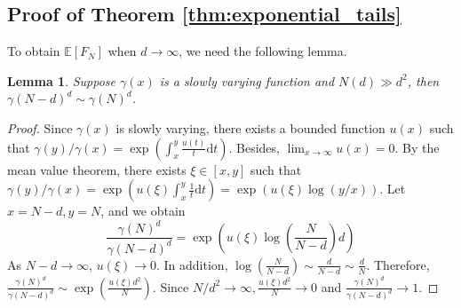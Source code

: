 \documentclass[conference,a4paper]{IEEEtran}
\def\E{\mathbb{E}}
\def\dd{\mathrm{d}}
\newtheorem{lemma}{Lemma}
\begin{document}
\subsection{Proof of Theorem \ref{thm:exponential_tails}}
To obtain $\E[F_N]$ when $d\to \infty$,
we need the following lemma.
\begin{lemma}\label{lem:ratio_epsilon}
     Suppose $\gamma(x)$ is a slowly varying function
     and $N(d)\gg d^2$,
     then $\gamma(N-d)^{d} \sim \gamma(N)^d$.
\end{lemma}
\begin{proof}
     Since $\gamma(x)$ is slowly varying, there exists
     a bounded function $u(x)$ such that
     $\gamma(y)/\gamma(x)=\exp(\int_{x}^y \frac{u(t)}{t}\dd t)$.
     Besides, $\lim_{x\to \infty} u(x) = 0$.
     By the mean value theorem, there exists $\xi \in [x,y]$ such that
     $\gamma(y)/\gamma(x)=\exp(u(\xi)\int_{x}^y \frac{1}{t}\dd t)
     =\exp(u(\xi)\log(y/x))$. Let $x=N-d, y=N$, and we obtain
     \begin{equation*}
          \frac{\gamma(N)^d}{\gamma(N-d)^d}
          = \exp \left(u(\xi) \log\left(\frac{N}{N-d} \right)d \right)
     \end{equation*}
     As $N-d\to \infty$, $u(\xi)\to 0$. In addition,
     $\log(\frac{N}{N-d}) \sim \frac{d}{N-d} \sim \frac{d}{N}$.
     Therefore,
     $\frac{\gamma(N)^d}{\gamma(N-d)^d}\sim \exp(\frac{u(\xi)d^2}{N})
     $. Since $N/d^2 \to \infty, \frac{u(\xi)d^2}{N} \to 0$ and
     $\frac{\gamma(N)^d}{\gamma(N-d)^d}\to 1$.
\end{proof}
\end{document}
